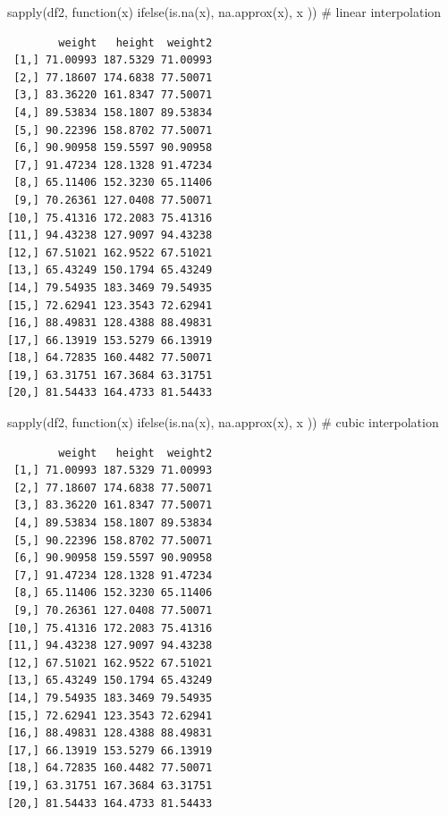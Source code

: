 \documentclass[
  letterpaper,
  DIV=11,
  numbers=noendperiod]{scrreprt}
\newenvironment{Shaded}{\begin{snugshade}}{\end{snugshade}}
\newcommand{\CommentTok}[1]{\textcolor[rgb]{0.37,0.37,0.37}{#1}}
\newcommand{\ControlFlowTok}[1]{\textcolor[rgb]{0.00,0.23,0.31}{#1}}
\newcommand{\FunctionTok}[1]{\textcolor[rgb]{0.28,0.35,0.67}{#1}}
\newcommand{\NormalTok}[1]{\textcolor[rgb]{0.00,0.23,0.31}{#1}}
\begin{document}
\begin{Shaded}
\begin{Highlighting}[]
\FunctionTok{sapply}\NormalTok{(df2, }\ControlFlowTok{function}\NormalTok{(x) }\FunctionTok{ifelse}\NormalTok{(}\FunctionTok{is.na}\NormalTok{(x), }\FunctionTok{na.approx}\NormalTok{(x), x )) }\CommentTok{\# linear interpolation}
\end{Highlighting}
\end{Shaded}

\begin{verbatim}
        weight   height  weight2
 [1,] 71.00993 187.5329 71.00993
 [2,] 77.18607 174.6838 77.50071
 [3,] 83.36220 161.8347 77.50071
 [4,] 89.53834 158.1807 89.53834
 [5,] 90.22396 158.8702 77.50071
 [6,] 90.90958 159.5597 90.90958
 [7,] 91.47234 128.1328 91.47234
 [8,] 65.11406 152.3230 65.11406
 [9,] 70.26361 127.0408 77.50071
[10,] 75.41316 172.2083 75.41316
[11,] 94.43238 127.9097 94.43238
[12,] 67.51021 162.9522 67.51021
[13,] 65.43249 150.1794 65.43249
[14,] 79.54935 183.3469 79.54935
[15,] 72.62941 123.3543 72.62941
[16,] 88.49831 128.4388 88.49831
[17,] 66.13919 153.5279 66.13919
[18,] 64.72835 160.4482 77.50071
[19,] 63.31751 167.3684 63.31751
[20,] 81.54433 164.4733 81.54433
\end{verbatim}

\begin{Shaded}
\begin{Highlighting}[]
\FunctionTok{sapply}\NormalTok{(df2, }\ControlFlowTok{function}\NormalTok{(x) }\FunctionTok{ifelse}\NormalTok{(}\FunctionTok{is.na}\NormalTok{(x), }\FunctionTok{na.approx}\NormalTok{(x), x )) }\CommentTok{\# cubic interpolation}
\end{Highlighting}
\end{Shaded}

\begin{verbatim}
        weight   height  weight2
 [1,] 71.00993 187.5329 71.00993
 [2,] 77.18607 174.6838 77.50071
 [3,] 83.36220 161.8347 77.50071
 [4,] 89.53834 158.1807 89.53834
 [5,] 90.22396 158.8702 77.50071
 [6,] 90.90958 159.5597 90.90958
 [7,] 91.47234 128.1328 91.47234
 [8,] 65.11406 152.3230 65.11406
 [9,] 70.26361 127.0408 77.50071
[10,] 75.41316 172.2083 75.41316
[11,] 94.43238 127.9097 94.43238
[12,] 67.51021 162.9522 67.51021
[13,] 65.43249 150.1794 65.43249
[14,] 79.54935 183.3469 79.54935
[15,] 72.62941 123.3543 72.62941
[16,] 88.49831 128.4388 88.49831
[17,] 66.13919 153.5279 66.13919
[18,] 64.72835 160.4482 77.50071
[19,] 63.31751 167.3684 63.31751
[20,] 81.54433 164.4733 81.54433
\end{verbatim}
\end{document}
